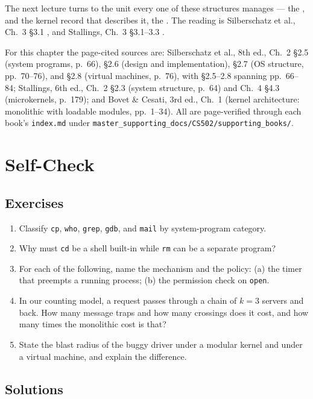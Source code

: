 \documentclass[11pt]{article}
\begin{document}
The next lecture turns to the unit every one of these structures manages --- the
, and the kernel record that describes it, the . The reading is Silberschatz et al., Ch.~3 \S3.1
\cite{SilberschatzOSC_operating_system_concepts}, and Stallings, Ch.~3
\S3.1--3.3 \cite{StallingsOS_internals_design_principles}.

For this chapter the page-cited sources are: Silberschatz et al., 8th ed.,
Ch.~2 \S2.5 (system programs, p.~66), \S2.6 (design and implementation),
\S2.7 (OS structure, pp.~70--76), and \S2.8 (virtual machines, p.~76), with
\S2.5--2.8 spanning pp.~66--84; Stallings, 6th ed., Ch.~2 \S2.3 (system
structure, p.~64) and Ch.~4 \S4.3 (microkernels, p.~179); and Bovet \& Cesati,
3rd ed., Ch.~1 (kernel architecture: monolithic with loadable modules,
pp.~1--34). All are page-verified through each book's \texttt{index.md} under
\texttt{master\_supporting\_docs/CS502/supporting\_books/}.

\section*{Self-Check}

\subsection*{Exercises}

\begin{enumerate}
  \item Classify \texttt{cp}, \texttt{who}, \texttt{grep}, \texttt{gdb},
        and \texttt{mail} by system-program category.
  \item Why must \texttt{cd} be a shell built-in while \texttt{rm} can be a
        separate program?
  \item For each of the following, name the mechanism and the policy: (a) the
        timer that preempts a running process; (b) the permission check on
        \texttt{open}.
  \item In our counting model, a request passes through a chain of $k=3$
        servers and back. How many message traps and how many crossings does it
        cost, and how many times the monolithic cost is that?
  \item State the blast radius of the buggy driver under a modular kernel and
        under a virtual machine, and explain the difference.
\end{enumerate}

\subsection*{Solutions}
\end{document}

